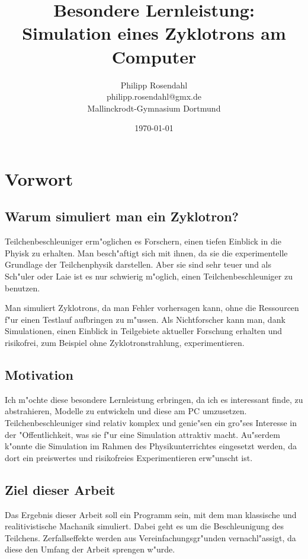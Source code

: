 \documentclass[14pt, a4paper]{report}
\begin{document}

\title{\bfseries \Large Besondere Lernleistung: \\ \Huge \color{titleblue}Simulation eines Zyklotrons am Computer}
\author{Philipp Rosendahl \\ philipp.rosendahl@gmx.de \\ Mallinckrodt-Gymnasium Dortmund}
\date{\today}

\maketitle

\tableofcontents

\chapter{Vorwort}
\section{Warum simuliert man ein Zyklotron?}
Teilchenbeschleuniger erm"oglichen es Forschern, einen tiefen Einblick in die
Phyisk zu erhalten. Man besch"aftigt sich mit ihnen, da sie die
experimentelle Grundlage der Teilchenphysik darstellen. Aber sie sind sehr
teuer und als Sch"uler oder Laie ist es nur schwierig m"oglich, einen
Teilchenbeschleuniger zu benutzen.

Man simuliert Zyklotrons, da man Fehler vorhersagen kann, ohne die Ressourcen
f"ur einen Testlauf aufbringen zu m"ussen. Als Nichtforscher kann man, dank 
Simulationen, einen Einblick in Teilgebiete aktueller Forschung erhalten und risikofrei,
zum Beispiel ohne Zyklotronstrahlung, experimentieren.

\section{Motivation}
Ich m"ochte diese besondere Lernleistung erbringen, da ich es interessant finde, 
zu abstrahieren, Modelle zu entwickeln und diese am PC umzusetzen. 
Teilchenbeschleuniger sind relativ komplex und genie"sen ein gro"ses Interesse
in der "Offentlichkeit, was sie f"ur eine Simulation attraktiv macht. Au"serdem
k"onnte die Simulation im Rahmen des Physikunterrichtes eingesetzt werden, da dort 
ein preiswertes und risikofreies Experimentieren erw"unscht ist.
\section{Ziel dieser Arbeit}
Das Ergebnis dieser Arbeit soll ein Programm sein, mit dem man klassische und 
realitivistische Machanik simuliert. Dabei geht es um die Beschleunigung des Teilchens.
Zerfallseffekte werden aus Vereinfachungsgr"unden vernachl"assigt, da diese den
Umfang der Arbeit sprengen w"urde.
\end{document}
